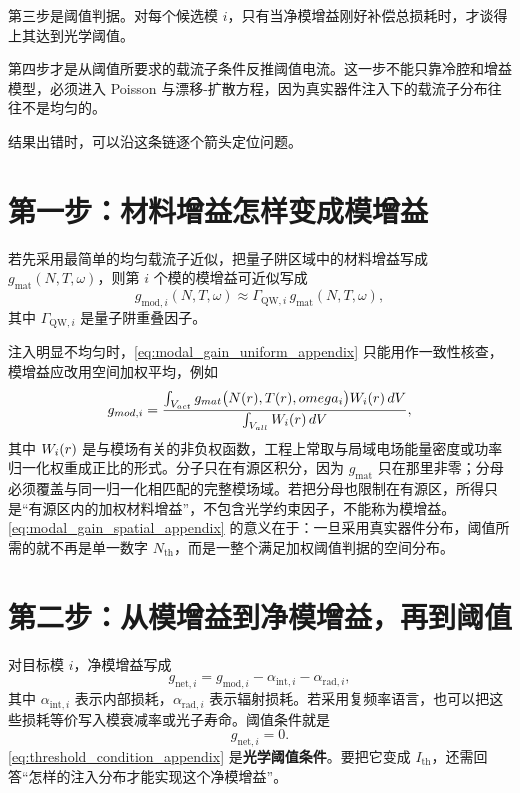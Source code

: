 第三步是阈值判据。对每个候选模 $i$，只有当净模增益刚好补偿总损耗时，才谈得上其达到光学阈值。

第四步才是从阈值所要求的载流子条件反推阈值电流。这一步不能只靠冷腔和增益模型，必须进入 Poisson 与漂移-扩散方程，因为真实器件注入下的载流子分布往往不是均匀的。

结果出错时，可以沿这条链逐个箭头定位问题。

\section{第一步：材料增益怎样变成模增益}
若先采用最简单的均匀载流子近似，把量子阱区域中的材料增益写成 $g_{\mathrm{mat}}(N,T,\omega)$，则第 $i$ 个模的模增益可近似写成
\begin{equation}
g_{\mathrm{mod},i}(N,T,\omega)
\approx
\Gamma_{\mathrm{QW},i}\,g_{\mathrm{mat}}(N,T,\omega),
\label{eq:modal_gain_uniform_appendix}
\end{equation}
其中 $\Gamma_{\mathrm{QW},i}$ 是量子阱重叠因子。

注入明显不均匀时，\cref{eq:modal_gain_uniform_appendix} 只能用作一致性核查，模增益应改用空间加权平均，例如
\begin{equation}
g_{mod,i}
=
\frac{\int_{V_{act}} g_{mat}\bigl(N(r),T(r),omega_i\bigr)
W_i(r)\,d V}
{\int_{V_{all}} W_i(r)\,d V},
\label{eq:modal_gain_spatial_appendix}
\end{equation}
其中 $W_i(r)$ 是与模场有关的非负权函数，工程上常取与局域电场能量密度或功率归一化权重成正比的形式。分子只在有源区积分，因为 $g_{\mathrm{mat}}$ 只在那里非零；分母必须覆盖与同一归一化相匹配的完整模场域。若把分母也限制在有源区，所得只是“有源区内的加权材料增益”，不包含光学约束因子，不能称为模增益。\cref{eq:modal_gain_spatial_appendix} 的意义在于：一旦采用真实器件分布，阈值所需的就不再是单一数字 $N_{\mathrm{th}}$，而是一整个满足加权阈值判据的空间分布。

\section{第二步：从模增益到净模增益，再到阈值}
对目标模 $i$，净模增益写成
\begin{equation}
g_{\mathrm{net},i}
=
 g_{\mathrm{mod},i}
-
\alpha_{\mathrm{int},i}
-
\alpha_{\mathrm{rad},i},
\label{eq:net_modal_gain_appendix}
\end{equation}
其中 $\alpha_{\mathrm{int},i}$ 表示内部损耗，$\alpha_{\mathrm{rad},i}$ 表示辐射损耗。若采用复频率语言，也可以把这些损耗等价写入模衰减率或光子寿命。阈值条件就是
\begin{equation}
g_{\mathrm{net},i}=0.
\label{eq:threshold_condition_appendix}
\end{equation}
\cref{eq:threshold_condition_appendix} 是\textbf{光学阈值条件}。要把它变成 $I_{\mathrm{th}}$，还需回答“怎样的注入分布才能实现这个净模增益”。

